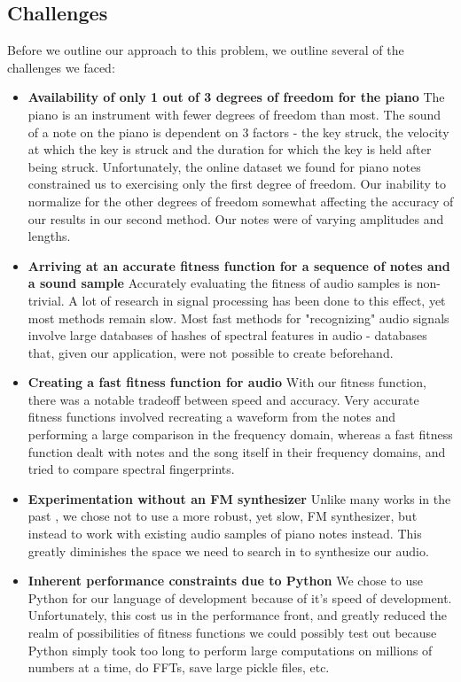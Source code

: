 \documentclass{pnastwo}
\begin{document}
\begin{article}
\subsection{Challenges}
Before we outline our approach to this problem, we outline several of the challenges we faced:
\begin{itemize}
\item \textbf{Availability of only 1 out of 3 degrees of freedom for the piano} The piano is an instrument with fewer degrees of freedom than most. The sound of a note on the piano is dependent on 3 factors - the key struck, the velocity at which the key is struck and the duration for which the key is held after being struck. Unfortunately, the online dataset we found for piano notes constrained us to exercising only the first degree of freedom. Our inability to normalize for the other degrees of freedom somewhat affecting the accuracy of our results in our second method. Our notes were of varying amplitudes and lengths.
\item \textbf{Arriving at an accurate fitness function for a sequence of notes and a sound sample} Accurately evaluating the fitness of audio samples is non-trivial. A lot of research in signal processing has been done to this effect, yet most methods remain slow. Most fast methods for "recognizing" audio signals involve large databases of hashes of spectral features in audio - databases that, given our application, were not possible to create beforehand. 
\item \textbf{Creating a fast fitness function for audio} With our fitness function, there was a notable tradeoff between speed and accuracy. Very accurate fitness functions involved recreating a waveform from the notes and performing a large comparison in the frequency domain, whereas a fast fitness function dealt with notes and the song itself in their frequency domains, and tried to compare spectral fingerprints.
\item \textbf{Experimentation without an FM synthesizer } Unlike many works in the past \cite{garcia}, we chose not to use a more robust, yet slow, FM synthesizer, but instead to work with existing audio samples of piano notes instead. This greatly diminishes the space we need to search in to synthesize our audio.
\item \textbf{Inherent performance constraints due to Python} We chose to use Python for our language of development because of it's speed of development. Unfortunately, this cost us in the performance front, and greatly reduced the realm of possibilities of fitness functions we could possibly test out because Python simply took too long to perform large computations on millions of numbers at a time, do FFTs, save large pickle files, etc.
\end{itemize}

\end{article}
\end{document}
